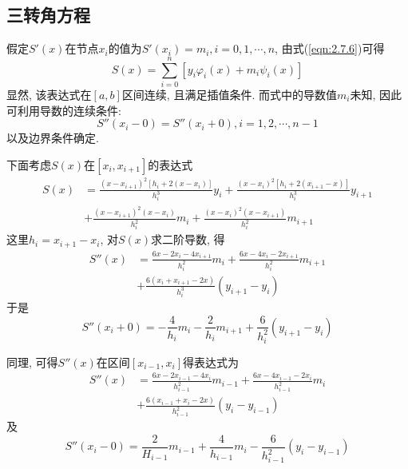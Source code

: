 \subsection{三转角方程}

假定$S'(x)$在节点$x_i$的值为$S'(x_i)=m_i,i=0,1,\cdots,n$, 由式(\ref{eqn:2.7.6})可得
\begin{equation*}
    S(x)=\sum_{i=0}^n\left[y_i\varphi_i(x)+m_i\psi_i(x)\right]
\end{equation*}
显然, 该表达式在$[a,b]$区间连续, 且满足插值条件. 而式中的导数值$m_i$未知, 因此可利用导数的连续条件:
\begin{equation*}
    S''(x_i-0)=S''(x_i+0), i=1,2,\cdots,n-1
\end{equation*}
以及边界条件确定. 

下面考虑$S(x)$在$[x_i,x_{i+1}]$的表达式
\begin{align*}
    S(x)&=\frac{(x-x_{i+1})^2[h_i+2(x-x_i)]}{h_i^3}y_i+\frac{(x-x_i)^2[h_i+2(x_{i+1}-x)]}{h_i^3}y_{i+1}\\
    &+\frac{(x-x_{i+1})^2(x-x_i)}{h_i^2}m_i+\frac{(x-x_i)^2(x-x_{i+1})}{h_i^2}m_{i+1}
\end{align*}
这里$h_i=x_{i+1}-x_i$, 对$S(x)$求二阶导数, 得
\begin{align*}
    S''(x)&=\frac{6x-2x_i-4x_{i+1}}{h_i^2}m_i+\frac{6x-4x_i-2x_{i+1}}{h_i^2}m_{i+1}\\
    &+\frac{6(x_i+x_{i+1}-2x)}{h_i^3}(y_{i+1}-y_i)
\end{align*}
于是
\begin{equation*}
    S''(x_i+0)=-\frac{4}{h_i}m_i-\frac{2}{h_i}m_{i+1}+\frac{6}{h_i^2}(y_{i+1}-y_i)
\end{equation*}

同理, 可得$S''(x)$在区间$[x_{i-1},x_i]$得表达式为
\begin{align*}
    S''(x)&=\frac{6x-2x_{i-1}-4x_i}{h_{i-1}^2}m_{i-1}+\frac{6x-4x_{i-1}-2x_i}{h_{i-1}^2}m_i\\
    &+\frac{6(x_{i-1}+x_i-2x)}{h_{i-1}^2}(y_i-y_{i-1})
\end{align*}
及
\begin{equation*}
    S''(x_i-0)=\frac{2}{H_{i-1}}m_{i-1}+\frac{4}{h_{i-1}}m_i-\frac{6}{h_{i-1}^2}(y_i-y_{i-1})
\end{equation*}


